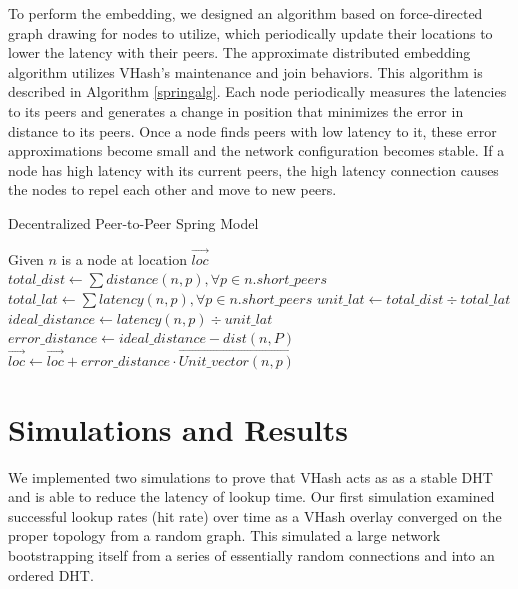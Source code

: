 \documentclass[10pt, conference, letterpaper]{IEEEtran}
\begin{document}
To perform the embedding, we designed an algorithm based on force-directed graph drawing \cite{Spring} for nodes to utilize, which periodically update their locations to lower the latency with their peers.
The approximate distributed embedding algorithm utilizes VHash's maintenance and join behaviors.
This algorithm is described in Algorithm \ref{springalg}. Each node periodically measures the latencies to its peers and generates a change in position that minimizes the error in distance to its peers.
Once a node finds peers with low latency to it, these error approximations become small and the network configuration becomes stable.
If a node has high latency with its current peers, the high latency connection causes the nodes to repel each other and move to new peers.

\begin{algorithm}
\caption{Decentralized Peer-to-Peer Spring Model}
\label{springalg}
\begin{algorithmic}[1] 
	\STATE Given $n$ is a node at location $\overrightarrow{loc}$
    \STATE $total\_dist \leftarrow \sum distance(n,p),\forall p \in n.short\_peers$
    \STATE $total\_lat \leftarrow \sum latency(n,p),\forall p \in n.short\_peers$
    \STATE $unit\_lat \leftarrow total\_dist \div total\_lat$
    	\STATE $ideal\_distance \leftarrow latency(n,p) \div unit\_lat$
        \STATE $error\_distance \leftarrow ideal\_distance - dist(n,P)$
        \STATE $\overrightarrow{loc} \leftarrow \overrightarrow{loc} + error\_distance \cdot \overrightarrow{Unit\_vector(n,p)} $
    \ENDFOR
\end{algorithmic}
\end{algorithm}






\section{Simulations and Results}
\label{simSection}
We implemented two simulations to prove that VHash acts as as a stable DHT and is able to reduce the latency of lookup time.
Our first simulation examined successful lookup rates (hit rate) over time as a VHash overlay converged on the proper topology from a random graph.  
This simulated a large network bootstrapping itself from a series of essentially random connections and into an ordered DHT.
  
\end{document}
